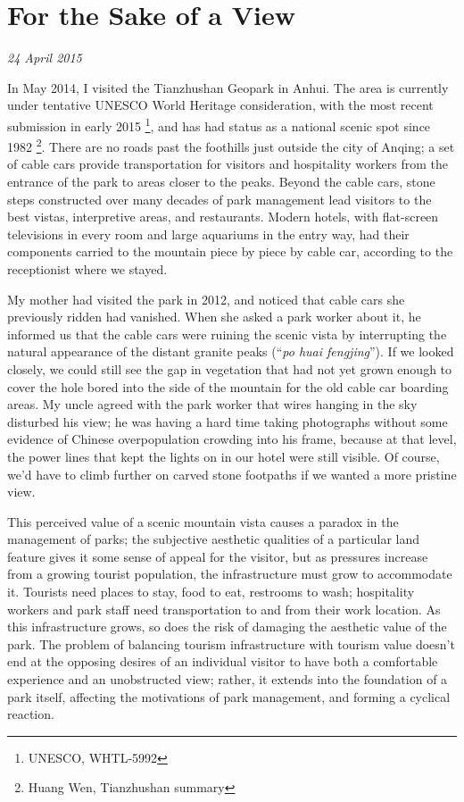 \section{For the Sake of a View}

\textit{24 April 2015}

In May 2014, I visited the Tianzhushan Geopark in Anhui. The area is currently
under tentative UNESCO World Heritage consideration, with the most recent submission in
early 2015 \footnote{UNESCO, WHTL-5992}, and has had status
as a national scenic spot since 1982 \footnote{Huang Wen, Tianzhushan summary}.  There are no roads past the
foothills just outside the city of Anqing; a set of cable cars provide
transportation for visitors and hospitality workers from the entrance of the
park to areas closer to the peaks. Beyond the cable cars, stone steps
constructed over many decades of park management lead visitors to the best
vistas, interpretive areas, and restaurants. Modern hotels, with flat-screen
televisions in every room and large aquariums in the entry way, had their
components carried to the mountain piece by piece by cable car, according to
the receptionist where we stayed.

My mother had visited the park in 2012, and noticed that cable cars she
previously ridden had vanished. When she asked a park worker about it, he
informed us that the cable cars were ruining the scenic vista by interrupting the
natural appearance of the distant granite peaks (``\textit{po huai fengjing}''). If we looked closely, we
could still see the gap in vegetation that had not yet grown enough to cover
the hole bored into the side of the mountain for the old cable car boarding
areas. My uncle agreed with the park worker that wires hanging in the sky
disturbed his view; he was having a hard time taking photographs without some
evidence of Chinese overpopulation crowding into his frame, because at that level,
the power lines that kept the lights on in our hotel were still visible. Of course, we'd
have to climb further on carved stone footpaths if we wanted a more pristine
view.

This perceived value of a scenic mountain vista causes a paradox in the
management of parks; the subjective aesthetic qualities of a particular land
feature gives it some sense of appeal for the visitor, but as pressures
increase from a growing tourist population, the infrastructure must grow to accommodate it.
Tourists need places to stay, food to eat, restrooms to wash; hospitality workers and
park staff need transportation to and from their work location. As this infrastructure
grows, so does the risk of damaging the aesthetic value of the park. The problem
of balancing tourism infrastructure with tourism value doesn't end at the
opposing desires of an individual visitor to have both a comfortable
experience and an unobstructed view; rather, it extends into the foundation
of a park itself, affecting the motivations of park management, and forming a cyclical reaction.

